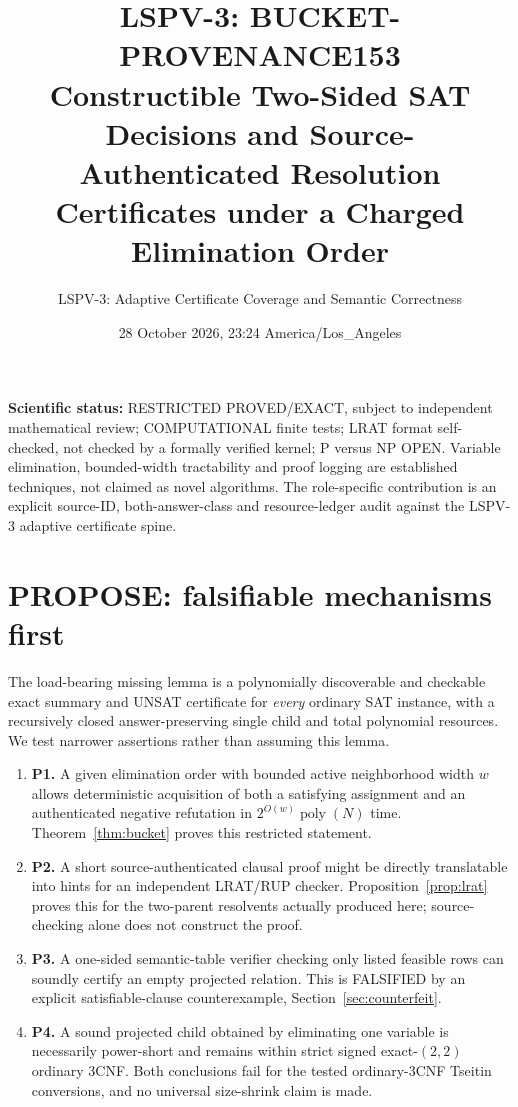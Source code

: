 \documentclass[11pt]{article}
\title{LSPV-3: BUCKET-PROVENANCE153\\Constructible Two-Sided SAT Decisions and Source-Authenticated Resolution Certificates under a Charged Elimination Order}
\author{LSPV-3: Adaptive Certificate Coverage and Semantic Correctness}
\date{28 October 2026, 23:24 America/Los\_Angeles}
\begin{document}
\maketitle
\noindent\textbf{Scientific status:} RESTRICTED PROVED/EXACT, subject to independent mathematical review; COMPUTATIONAL finite tests; LRAT format self-checked, not checked by a formally verified kernel; P versus NP OPEN. Variable elimination, bounded-width tractability and proof logging are established techniques, not claimed as novel algorithms. The role-specific contribution is an explicit source-ID, both-answer-class and resource-ledger audit against the LSPV-3 adaptive certificate spine.

\section{PROPOSE: falsifiable mechanisms first}
The load-bearing missing lemma is a polynomially discoverable and checkable exact summary and UNSAT certificate for \emph{every} ordinary SAT instance, with a recursively closed answer-preserving single child and total polynomial resources. We test narrower assertions rather than assuming this lemma.
\begin{enumerate}
\item[] \textbf{P1.} A given elimination order with bounded active neighborhood width $w$ allows deterministic acquisition of both a satisfying assignment and an authenticated negative refutation in $2^{O(w)}\operatorname{poly}(N)$ time. Theorem~\ref{thm:bucket} proves this restricted statement.
\item[] \textbf{P2.} A short source-authenticated clausal proof might be directly translatable into hints for an independent LRAT/RUP checker. Proposition~\ref{prop:lrat} proves this for the two-parent resolvents actually produced here; source-checking alone does not construct the proof.
\item[] \textbf{P3.} A one-sided semantic-table verifier checking only listed feasible rows can soundly certify an empty projected relation. This is FALSIFIED by an explicit satisfiable-clause counterexample, Section~\ref{sec:counterfeit}.
\item[] \textbf{P4.} A sound projected child obtained by eliminating one variable is necessarily power-short and remains within strict signed exact-$(2,2)$ ordinary 3CNF. Both conclusions fail for the tested ordinary-3CNF Tseitin conversions, and no universal size-shrink claim is made.
\end{enumerate}
\end{document}

